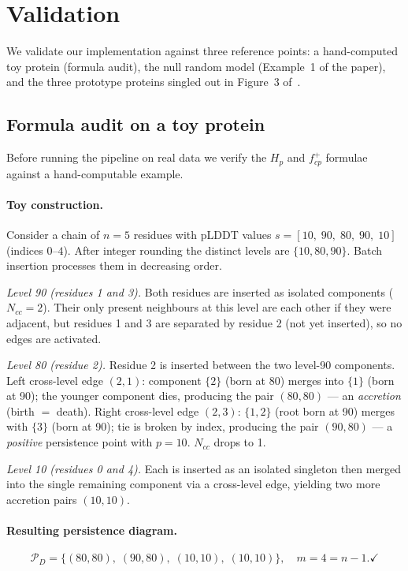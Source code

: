 \section{Validation}
\label{sec:validation}

We validate our implementation against three reference points: a
hand-computed toy protein (formula audit), the null random model (Example~1
of the paper), and the three prototype proteins singled out in Figure~3
of~\cite{cazals2025alphafold}.

\subsection{Formula audit on a toy protein}
\label{sec:validation_toy}

Before running the pipeline on real data we verify the $H_p$ and $f^+_{cp}$
formulae against a hand-computable example.

\paragraph{Toy construction.}
Consider a chain of $n = 5$ residues with pLDDT values
$s = [10,\;90,\;80,\;90,\;10]$ (indices $0$--$4$).
After integer rounding the distinct levels are $\{10, 80, 90\}$.
Batch insertion processes them in decreasing order.

\emph{Level 90 (residues 1 and 3).}
Both residues are inserted as isolated components ($N_{cc} = 2$).
Their only present neighbours at this level are each other if they were
adjacent, but residues 1 and 3 are separated by residue 2 (not yet inserted),
so no edges are activated.

\emph{Level 80 (residue 2).}
Residue 2 is inserted between the two level-90 components.
Left cross-level edge $(2,1)$: component $\{2\}$ (born at 80) merges into
$\{1\}$ (born at 90); the younger component dies, producing the pair
$(80, 80)$ — an \emph{accretion} (birth $=$ death).
Right cross-level edge $(2,3)$: $\{1,2\}$ (root born at 90) merges with
$\{3\}$ (born at 90); tie is broken by index, producing the pair $(90, 80)$
— a \emph{positive} persistence point with $p = 10$.
$N_{cc}$ drops to 1.

\emph{Level 10 (residues 0 and 4).}
Each is inserted as an isolated singleton then merged into the single
remaining component via a cross-level edge, yielding two more accretion
pairs $(10, 10)$.

\paragraph{Resulting persistence diagram.}
\[
  \mathcal{P}_D = \{(80,80),\;(90,80),\;(10,10),\;(10,10)\},
  \quad m = 4 = n-1.\checkmark
\]

